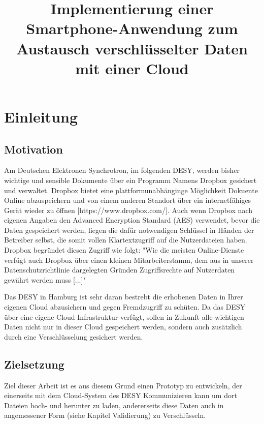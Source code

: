 \documentclass[10pt, a4paper]{scrreprt}
\begin{document}
\title{Implementierung einer Smartphone-Anwendung zum Austausch verschlüsselter Daten mit einer Cloud}

\titlepage
\maketitle
\tableofcontents


\part{Einleitung}
\chapter{Motivation}
Am Deutschen Elektronen Synchrotron, im folgenden DESY, werden bisher wichtige und sensible Dokumente über ein Programm Namens Dropbox gesichert und verwaltet. Dropbox bietet eine plattformunabhänginge Möglichkeit Dokuente Online abzuspeichern und von einem anderen Standort über ein internetfähiges Gerät wieder zu öffnen [https://www.dropbox.com/]. Auch wenn Dropbox nach eigenen Angaben den Advanced Encryption Standard (AES)  verwendet, bevor die Daten gespeichert werden, liegen die dafür notwendigen Schlüssel in Händen der Betreiber selbst, die somit vollen Klartextzugriff auf die Nutzerdateien haben. Dropbox begründet diesen Zugriff wie folgt:  "Wie die meisten Online-Dienste verfügt auch Dropbox über einen kleinen Mitarbeiterstamm, dem aus in unserer Datenschutzrichtlinie dargelegten Gründen Zugriffsrechte auf Nutzerdaten gewährt werden muss [...]" %

Das DESY in Hamburg ist sehr daran bestrebt die erhobenen Daten in Ihrer eigenen Cloud abzusichern und gegen Fremdzugriff zu schüten.
Da das DESY über eine eigene Cloud-Infrastruktur verfügt, sollen in Zukunft alle wichtigen Daten nicht nur in dieser Cloud gespeichert werden, sondern auch zusätzlich durch eine Verschlüsselung gesichert werden.


\chapter{Zielsetzung}
Ziel dieser Arbeit ist es aus diesem Grund einen Prototyp zu entwickeln, der einerseits mit dem Cloud-System des DESY Kommunizieren kann um dort Dateien hoch- und herunter zu laden, andererseits diese Daten auch in angemessener Form (siehe Kapitel Validierung) zu Verschlüsseln.
\end{document}
